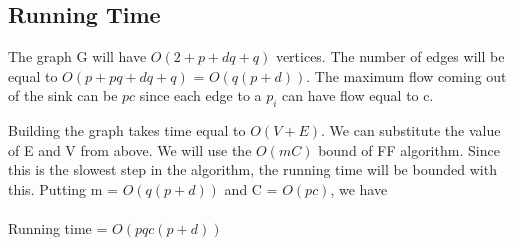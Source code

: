 \documentclass[11pt]{article}
\begin{document}
\subsection{Running Time}

The graph G will have $O( 2 + p + dq + q)$ vertices. The number of edges will be equal to $O( p + pq + dq + q)$ = $O( q( p + d))$. 
The maximum flow coming out of the sink can be $pc$ since each edge to a $p_i$ can have flow equal to c.

Building the graph takes time equal to $O( V + E)$. We can substitute the value of E and V from above.
We will use the $O(mC)$ bound of FF algorithm. Since this is the slowest step in the algorithm, the running time will be bounded with this. Putting m  = $O( q( p + d))$ and C = $O(pc)$, we have\\\\
Running time = $O(pqc( p + d))$
\end{document}
